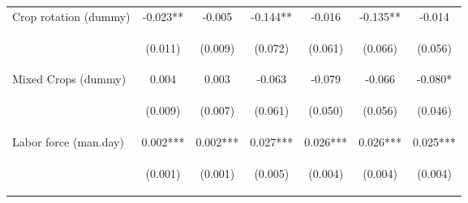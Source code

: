 \begin{center}
\begin{tabular}{lcccccc}
Crop rotation (dummy) & -0.023** & -0.005 & -0.144** & -0.016 & -0.135** & -0.014 \\
\vspace{4pt} & \begin{footnotesize}(0.011)\end{footnotesize} & \begin{footnotesize}(0.009)\end{footnotesize} & \begin{footnotesize}(0.072)\end{footnotesize} & \begin{footnotesize}(0.061)\end{footnotesize} & \begin{footnotesize}(0.066)\end{footnotesize} & \begin{footnotesize}(0.056)\end{footnotesize} \\
Mixed Crops (dummy) & 0.004 & 0.003 & -0.063 & -0.079 & -0.066 & -0.080* \\
\vspace{4pt} & \begin{footnotesize}(0.009)\end{footnotesize} & \begin{footnotesize}(0.007)\end{footnotesize} & \begin{footnotesize}(0.061)\end{footnotesize} & \begin{footnotesize}(0.050)\end{footnotesize} & \begin{footnotesize}(0.056)\end{footnotesize} & \begin{footnotesize}(0.046)\end{footnotesize} \\
Labor force (man.day) & 0.002*** & 0.002*** & 0.027*** & 0.026*** & 0.026*** & 0.025*** \\
\vspace{4pt} & \begin{footnotesize}(0.001)\end{footnotesize} & \begin{footnotesize}(0.001)\end{footnotesize} & \begin{footnotesize}(0.005)\end{footnotesize} & \begin{footnotesize}(0.004)\end{footnotesize} & \begin{footnotesize}(0.004)\end{footnotesize} & \begin{footnotesize}(0.004)\end{footnotesize} \\

\end{tabular}
\end{center}
